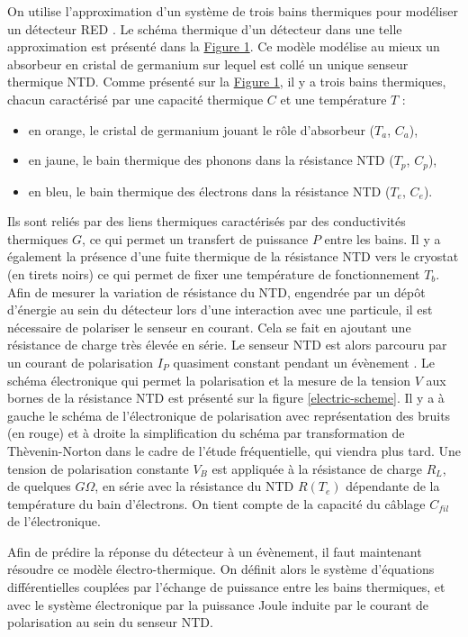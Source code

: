 On utilise l'approximation d'un système de trois bains thermiques pour modéliser un détecteur RED \cite{note}. Le schéma thermique d'un détecteur dans une telle approximation est présenté dans la \hyperref[thermal-scheme]{Figure 1}. Ce modèle modélise au mieux \cite{albert} \cite{benjamin} un absorbeur en cristal de germanium sur lequel est collé un unique senseur thermique NTD. Comme présenté sur la \hyperref[thermal-scheme]{Figure 1}, il y a trois bains thermiques, chacun caractérisé par une capacité thermique $C$ et une température $T$ :
\begin{itemize}
\item en orange, le cristal de germanium jouant le rôle d'absorbeur ($T_a$, $C_a$),
\item en jaune, le bain thermique des phonons dans la résistance NTD ($T_p$, $C_p$),
\item en bleu, le bain thermique des électrons dans la résistance NTD ($T_e$, $C_e$).
\end{itemize}
Ils sont reliés par des liens thermiques caractérisés par des conductivités thermiques $G$, ce qui permet un transfert de puissance $P$ entre les bains. Il y a également la présence d'une fuite thermique de la résistance NTD vers le cryostat (en tirets noirs) ce qui permet de fixer une température de fonctionnement $T_b$.
Afin de mesurer la variation de résistance du NTD, engendrée par un dépôt d'énergie au sein du détecteur lors d'une interaction avec une particule, il est nécessaire de polariser le senseur en courant. Cela se fait en ajoutant une résistance de charge très élevée en série. Le senseur NTD est alors parcouru par un courant de polarisation $I_P$ quasiment constant pendant un évènement \cite{elec}. Le schéma électronique qui permet la polarisation et la mesure de la tension $V$ aux bornes de la résistance NTD est présenté sur la figure \ref{electric-scheme}. Il y a à gauche le schéma de l'électronique de polarisation avec représentation des bruits (en rouge) et à droite la simplification du schéma par transformation de Thèvenin-Norton \cite{mather} dans le cadre de l'étude fréquentielle, qui viendra plus tard. Une tension de polarisation constante $V_B$ est appliquée à la résistance de charge $R_L$, de quelques $G\Omega$, en série avec la résistance du NTD $R(T_e)$ dépendante de la température du bain d'électrons. On tient compte de la capacité du câblage $C_{fil}$ de l'électronique.

Afin de prédire la réponse du détecteur à un évènement, il faut maintenant résoudre ce modèle électro-thermique. On définit alors le système d'équations différentielles couplées par l'échange de puissance entre les bains thermiques, et avec le système électronique par la puissance Joule induite par le courant de polarisation au sein du senseur NTD.

